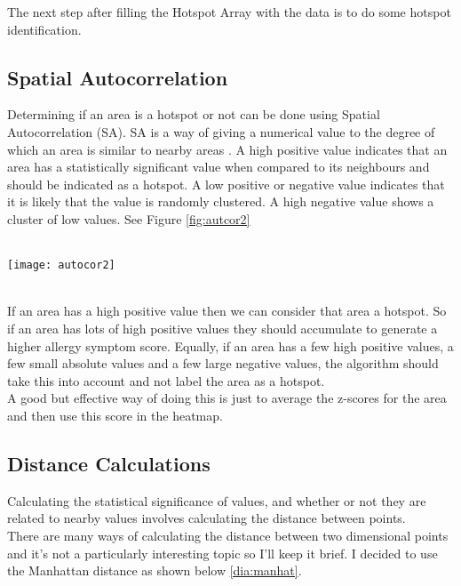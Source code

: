 The next step after filling the Hotspot Array with the data is to do some hotspot identification.

\subsection{Spatial Autocorrelation}

Determining if an area is a hotspot or not can be done using Spatial Autocorrelation (SA). SA is a way of giving a numerical value to the degree of which an area is similar to nearby areas \cite{autocor} . A high positive value indicates that an area has a statistically significant value when compared to its neighbours and should be indicated as a hotspot. A low positive or negative value indicates that it is likely that the value is randomly clustered. A high negative value shows a cluster of low values. See Figure \ref{fig:autcor2}\\

\begin{SCfigure}
\label{fig:autocor2}
\caption{Figure \ref{fig:autocor2} : Spatial Autocorrelation}\\
\centering
\texttt{[image: autocor2]}
\centering
\end{SCfigure}\\

If an area has a high positive value then we can consider that area a hotspot. So if an area has lots of high positive values they should accumulate to generate a higher allergy symptom score. Equally, if an area has a few high positive values, a few small absolute values and a few large negative values, the algorithm should take this into account and not label the area as a hotspot.\\

A good but effective way of doing this is just to average the z-scores for the area and then use this score in the heatmap.

\subsection{Distance Calculations}

Calculating the statistical significance of values, and whether or not they are related to nearby values involves calculating the distance between points.\\

There are many ways of calculating the distance between two dimensional points and it's not a particularly interesting topic so I'll keep it brief. I decided to use the Manhattan distance as shown below \ref{dia:manhat}.\\

